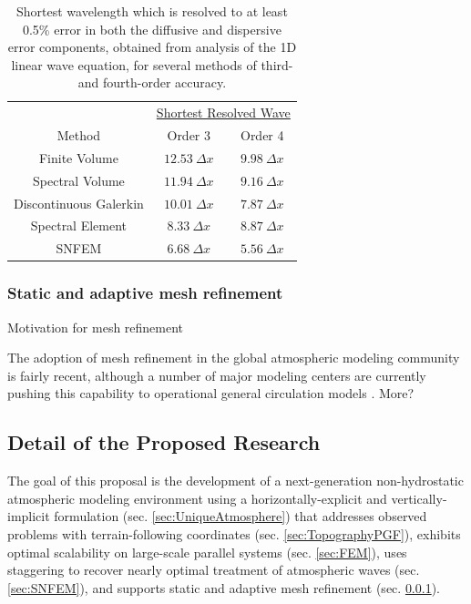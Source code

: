 \documentclass[11pt]{article}
\begin{document}
\begin{table}
\begin{center}
\begin{tabular}{ccc}
\hline & \multicolumn{2}{c}{\underline{Shortest Resolved Wave}} \\
Method & Order 3 & Order 4 \\
\hline \hline Finite Volume & $12.53\ \Delta x$ & $9.98\ \Delta x$ \\
Spectral Volume & $11.94\ \Delta x$ & $9.16\ \Delta x$ \\
Discontinuous Galerkin & $10.01\ \Delta x$ & $7.87\ \Delta x$ \\
Spectral Element & $8.33\ \Delta x$ & $8.87\ \Delta x$ \\
SNFEM & $6.68\ \Delta x$ & $5.56\ \Delta x$ \\
\hline
\end{tabular}
\end{center}
\caption{Shortest wavelength which is resolved to at least 0.5\% error in both the diffusive and dispersive error components, obtained from analysis of the 1D linear wave equation, for several methods of third- and fourth-order accuracy.} \label{tab:ShortestResolvedWave}
\end{table}

\subsubsection{Static and adaptive mesh refinement} \label{sec:Refinement}

{\color{blue} Motivation for mesh refinement}

The adoption of mesh refinement in the global atmospheric modeling community is fairly recent, although a number of major modeling centers are currently pushing this capability to operational general circulation models \citep{WCSJBKMGDLDFSHPTDR2012MWR, LMHSJL2013MWR, CMZCJMAT2013MWR}.  {\color{blue} More?}

\subsection{Detail of the Proposed Research} \label{sec:Research}

The goal of this proposal is the development of a next-generation non-hydrostatic atmospheric modeling environment using a horizontally-explicit and vertically-implicit formulation (sec. \ref{sec:UniqueAtmosphere}) that addresses observed problems with terrain-following coordinates (sec. \ref{sec:TopographyPGF}), exhibits optimal scalability on large-scale parallel systems (sec. \ref{sec:FEM}), uses staggering to recover nearly optimal treatment of atmospheric waves (sec. \ref{sec:SNFEM}), and supports static and adaptive mesh refinement (sec. \ref{sec:Refinement}).
\end{document}
